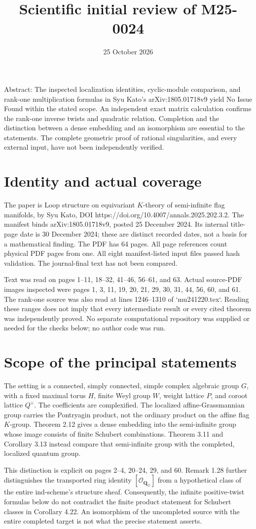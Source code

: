\documentclass[10pt]{article}
\title{Scientific initial review of M25-0024}
\author{}
\date{25 October 2026}
\begin{document}
\maketitle
Abstract: The inspected localization identities, cyclic-module comparison, and rank-one multiplication formulas in Syu Kato’s arXiv:1805.01718v9 yield No Issue Found within the stated scope. An independent exact matrix calculation confirms the rank-one inverse twists and quadratic relation. Completion and the distinction between a dense embedding and an isomorphism are essential to the statements. The complete geometric proof of rational singularities, and every external input, have not been independently verified.\par
\section*{Identity and actual coverage}
The paper is Loop structure on equivariant \(K\)-theory of semi-infinite flag manifolds, by Syu Kato, DOI https://doi.org/10.4007/annals.2025.202.3.2. The manifest binds arXiv:1805.01718v9, posted 25 December 2024. Its internal title-page date is 30 December 2024; these are distinct recorded dates, not a basis for a mathematical finding. The PDF has 64 pages. All page references count physical PDF pages from one. All eight manifest-listed input files passed hash validation. The journal-final text has not been compared.\par
Text was read on pages 1–11, 18–32, 41–46, 56–61, and 63. Actual source-PDF images inspected were pages 1, 3, 11, 19, 20, 21, 29, 30, 31, 44, 56, 60, and 61. The rank-one source was also read at lines 1246–1310 of `mu241220.tex`. Reading these ranges does not imply that every intermediate result or every cited theorem was independently proved. No separate computational repository was supplied or needed for the checks below; no author code was run.\par
\section*{Scope of the principal statements}
The setting is a connected, simply connected, simple complex algebraic group \(G\), with a fixed maximal torus \(H\), finite Weyl group \(W\), weight lattice \(P\), and coroot lattice \(Q^\vee\). The coefficients are complexified. The localized affine-Grassmannian group carries the Pontryagin product, not the ordinary product on the affine flag \(K\)-group. Theorem 2.12 gives a dense embedding into the semi-infinite group whose image consists of finite Schubert combinations. Theorem 3.11 and Corollary 3.13 instead compare that semi-infinite group with the completed, localized quantum group.\par
This distinction is explicit on pages 2–4, 20–24, 29, and 60. Remark 1.28 further distinguishes the transported ring identity \([\mathcal O_{\mathbf Q_G}]\) from a hypothetical class of the entire ind-scheme’s structure sheaf. Consequently, the infinite positive-twist formulas below do not contradict the finite product statement for Schubert classes in Corollary 4.22. An isomorphism of the uncompleted source with the entire completed target is not what the precise statement asserts.\par
\end{document}
